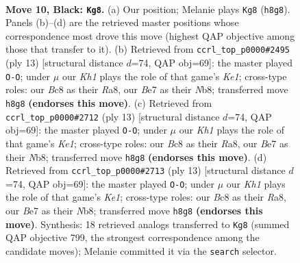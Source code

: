 \documentclass[11pt]{article}
\begin{document}
\clearpage

\begin{figure}[p]\centering
\begin{subfigure}{0.46\textwidth}\centering
\resizebox{\linewidth}{!}{%
\newchessgame
\chessboard[
  setfen={rnbq1r1k/pp1nbppp/4p3/3P4/P2P2PP/2N2N2/1P3P2/R1BQKB1R b KQ - 0 10},
  showmover=false,
  pgfstyle=straightmove, color=movearrow, markmove={h8-g8}
]}
\caption{}
\end{subfigure}\hfill
\begin{subfigure}{0.46\textwidth}\centering
\resizebox{\linewidth}{!}{%
\newchessgame
\chessboard[
  setfen={rnbqk2r/pp1nppbp/3P2p1/2p5/3P1P2/2N2N2/PPP3PP/R1BQKB1R b KQkq - 0 7},
  showmover=false,
  pgfstyle=straightmove, color=movearrow, markmove={e8-g8}
]}
\caption{}
\end{subfigure}
\\[4pt]
\begin{subfigure}{0.46\textwidth}\centering
\resizebox{\linewidth}{!}{%
\newchessgame
\chessboard[
  setfen={rnbqk2r/pp1nppbp/3P2p1/2p5/3P1P2/2N2N2/PPP3PP/R1BQKB1R b KQkq - 0 7},
  showmover=false,
  pgfstyle=straightmove, color=movearrow, markmove={e8-g8}
]}
\caption{}
\end{subfigure}\hfill
\begin{subfigure}{0.46\textwidth}\centering
\resizebox{\linewidth}{!}{%
\newchessgame
\chessboard[
  setfen={rnbqk2r/pp1nppbp/3P2p1/2p5/3P1P2/2N2N2/PPP3PP/R1BQKB1R b KQkq - 0 7},
  showmover=false,
  pgfstyle=straightmove, color=movearrow, markmove={e8-g8}
]}
\caption{}
\end{subfigure}
\caption{\textbf{Move 10, Black: \texttt{Kg8}.} (a) Our position; Melanie plays \texttt{Kg8} (\texttt{h8g8}). Panels (b)--(d) are the retrieved master positions whose correspondence most drove this move (highest QAP objective among those that transfer to it). (b) Retrieved from \texttt{ccrl\_top\_p0000\#2495} (ply 13) [structural distance $d$=74, QAP obj=69]: the master played \texttt{O-O}; under $\mu$ our \emph{Kh1} plays the role of that game's \emph{Ke1}; cross-type roles: our \emph{B}c8 as their \emph{R}a8, our \emph{B}e7 as their \emph{N}b8; transferred move \texttt{h8g8} \textbf{(endorses this move)}. (c) Retrieved from \texttt{ccrl\_top\_p0000\#2712} (ply 13) [structural distance $d$=74, QAP obj=69]: the master played \texttt{O-O}; under $\mu$ our \emph{Kh1} plays the role of that game's \emph{Ke1}; cross-type roles: our \emph{B}c8 as their \emph{R}a8, our \emph{B}e7 as their \emph{N}b8; transferred move \texttt{h8g8} \textbf{(endorses this move)}. (d) Retrieved from \texttt{ccrl\_top\_p0000\#2713} (ply 13) [structural distance $d$=74, QAP obj=69]: the master played \texttt{O-O}; under $\mu$ our \emph{Kh1} plays the role of that game's \emph{Ke1}; cross-type roles: our \emph{B}c8 as their \emph{R}a8, our \emph{B}e7 as their \emph{N}b8; transferred move \texttt{h8g8} \textbf{(endorses this move)}. Synthesis: 18 retrieved analogs transferred to \texttt{Kg8} (summed QAP objective 799, the strongest correspondence among the candidate moves); Melanie committed it via the \texttt{search} selector.}
\label{fig:thought-m19}
\end{figure}
\end{document}
